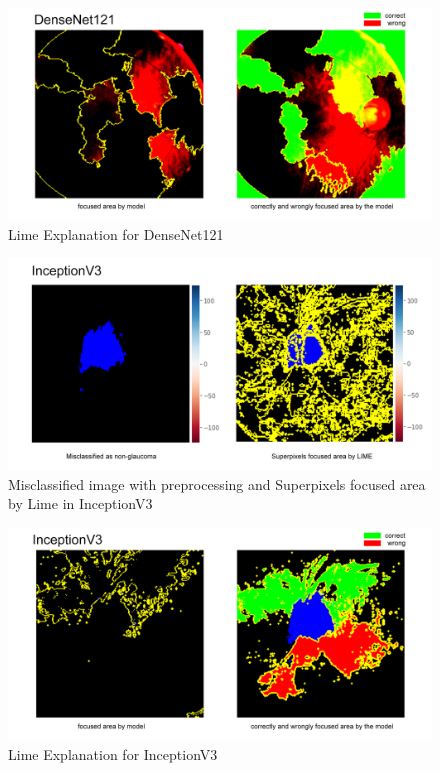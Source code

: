 \documentclass[conference]{IEEEtran}
\begin{document}
\begin{figure}[hbt!]
\centering
\includegraphics[scale=0.24]{fig-43.png}
\caption{Lime Explanation for DenseNet121}
\label{fig:x Lime Explanation for DenseNet121}
\end{figure}

\begin{figure}[hbt!]
\centering
\includegraphics[scale=0.24]{fig-44.png}
\caption{Misclassified image with preprocessing and Superpixels focused area by Lime in InceptionV3
}
\label{fig:x Misclassified image with preprocessing and Superpixels focused area by Lime in InceptionV3
}
\end{figure}

\begin{figure}[hbt!]
\centering
\includegraphics[scale=0.24]{fig-45.png}
\caption{Lime Explanation for InceptionV3}
\label{fig:x Lime Explanation for InceptionV3}
\end{figure}
\end{document}
